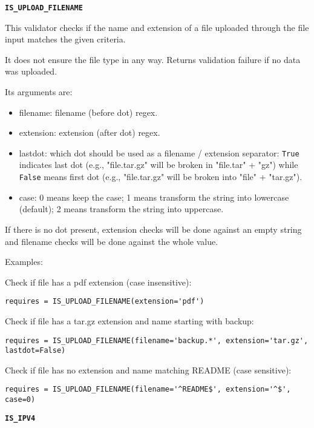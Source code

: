 \documentclass[justified,sixbynine,notoc]{tufte-book}
\def\ft{\small\tt}
\def\inxx#1{\index{#1}}
\begin{document}
\begin{fullwidth}
{\bf {\ft IS\_UPLOAD\_FILENAME}}

\inxx{IS\_UPLOAD\_FILENAME}

This validator checks if the name and extension of a file uploaded through the file input matches the given criteria.

It does not ensure the file type in any way. Returns validation failure
if no data was uploaded.

Its arguments are:
\begin{itemize}
\item filename: filename (before dot) regex.

\item extension: extension (after dot) regex.

\item lastdot: which dot should be used as a filename / extension separator: {\ft True} indicates last dot (e.g., "file.tar.gz" will be broken in "file.tar" + "gz") while {\ft False} means first dot (e.g., "file.tar.gz" will be broken into "file" + "tar.gz").

\item case: 0 means keep the case; 1 means transform the string into lowercase (default); 2 means transform the string into uppercase.
\end{itemize}

If there is no dot present, extension checks will be done against an empty
string and filename checks will be done against the whole value.

Examples:

Check if file has a pdf extension (case insensitive):
\begin{lstlisting}
requires = IS_UPLOAD_FILENAME(extension='pdf')
\end{lstlisting}

Check if file has a tar.gz extension and name starting with backup:
\begin{lstlisting}
requires = IS_UPLOAD_FILENAME(filename='backup.*', extension='tar.gz', lastdot=False)
\end{lstlisting}

Check if file has no extension and name matching README (case sensitive):
\begin{lstlisting}
requires = IS_UPLOAD_FILENAME(filename='^README$', extension='^$', case=0)
\end{lstlisting}

{\bf {\ft IS\_IPV4}}

\inxx{IS\_IPV4}


\end{fullwidth}
\end{document}
